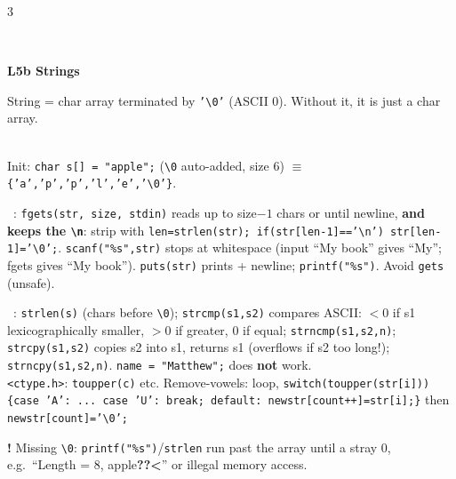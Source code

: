 \documentclass[landscape]{article}
\newcommand{\sect}[1]{\par\vspace{2pt}\noindent{\color{cur}\rule[-1.5pt]{\linewidth}{0.4pt}}\\[-7.5pt]%
  \noindent\colorbox{cur!12}{\parbox{\dimexpr\linewidth-2\fboxsep}{\color{cur}\bfseries #1}}\par\vspace{0.5pt}}
\newcommand{\sub}[1]{\par\vspace{1pt}{\color{cur}\bfseries #1}\ }
\newcommand{\key}[1]{\textbf{\color{BrickRed}#1}}
\newcommand{\warn}[1]{\par\noindent\colorbox{red!10}{\parbox{\dimexpr\linewidth-2\fboxsep}{\textcolor{red!70!black}{\textbf{!} } #1}}\par}
\newcommand{\tc}[1]{\texttt{#1}}
\newcommand{\bs}{\textbackslash}
\begin{document}
\begin{multicols*}{3}
\sect{L5b \; Strings}
String = char array terminated by \tc{'\bs0'} (ASCII 0). Without it, it is just a char array.\\
\\
Init: \tc{char s[] = "apple";} (\tc{\bs0} auto-added, size 6) $\equiv$ \tc{\{'a','p','p','l','e','\bs0'\}}.\\
\sub{I/O}: \tc{fgets(str, size, stdin)} reads up to size$-1$ chars or until newline, \key{and keeps the \tc{\bs n}}: strip with \tc{len=strlen(str); if(str[len-1]=='\bs n') str[len-1]='\bs0';}. \tc{scanf("\%s",str)} stops at whitespace (input ``My book'' gives ``My''; fgets gives ``My book''). \tc{puts(str)} prints + newline; \tc{printf("\%s")}. Avoid \tc{gets} (unsafe).\\
\sub{\tc{<string.h>}}: \tc{strlen(s)} (chars before \tc{\bs0}); \tc{strcmp(s1,s2)} compares ASCII: $<0$ if s1 lexicographically smaller, $>0$ if greater, 0 if equal; \tc{strncmp(s1,s2,n)}; \tc{strcpy(s1,s2)} copies s2 into s1, returns s1 (overflows if s2 too long!); \tc{strncpy(s1,s2,n)}. \tc{name = "Matthew";} does \textbf{not} work.\\
\tc{<ctype.h>}: \tc{toupper(c)} etc. Remove-vowels: loop, \tc{switch(toupper(str[i])) \{case 'A': ... case 'U': break; default: newstr[count++]=str[i];\}} then \tc{newstr[count]='\bs0';}\\
\warn{Missing \tc{\bs0}: \tc{printf("\%s")}/\tc{strlen} run past the array until a stray 0, e.g.\ ``Length = 8, apple\textbf{??<}'' or illegal memory access.}


\end{multicols*}
\end{document}
